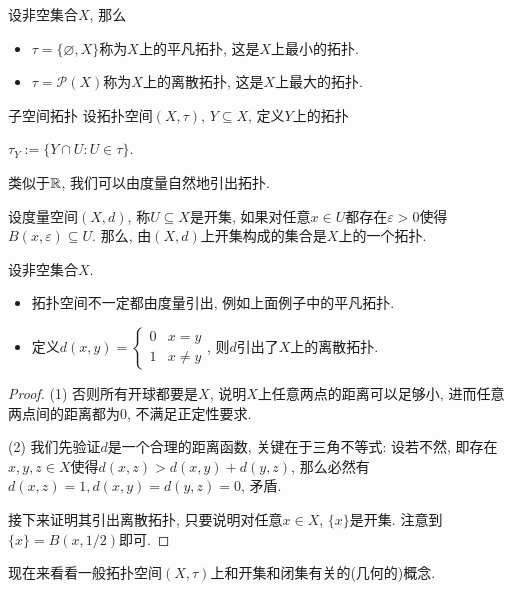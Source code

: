 \begin{example}
	设非空集合$X$, 那么
	\begin{itemize}
		\item $\tau = \{ \varnothing ,X\}$称为$X$上的平凡拓扑, 这是$X$上最小的拓扑. 
		\item $\tau = \mathcal{P}(X)$称为$X$上的离散拓扑, 这是$X$上最大的拓扑. 
	\end{itemize}
\end{example}

\begin{definition}{子空间拓扑}
	设拓扑空间$(X,\tau)$, $Y \subseteq X$, 定义$Y$上的拓扑
	\begin{center}
		$\tau _Y := \{ Y \cap U:U \in \tau \}. $
	\end{center}
\end{definition}

类似于$\mathbb{R}$, 我们可以由度量自然地引出拓扑. 

\begin{proposition}{}
	设度量空间$(X,d)$, 称$U \subseteq X$是开集, 如果对任意$x \in U$都存在$\varepsilon >0$使得$B(x,\varepsilon) \subseteq U$. 那么, 由$(X,d)$上开集构成的集合是$X$上的一个拓扑. 
\end{proposition}

\begin{example}
	设非空集合$X$. 
	\begin{itemize}
		\item 拓扑空间不一定都由度量引出, 例如上面例子中的平凡拓扑. 
		\item 定义$d(x,y)= \begin{cases}
 0 &  x=y \\
 1 &  x\neq y
\end{cases}$, 则$d$引出了$X$上的离散拓扑. 
	\end{itemize}
\end{example}
\begin{proof}
	(1) 否则所有开球都要是$X$, 说明$X$上任意两点的距离可以足够小, 进而任意两点间的距离都为$0$, 不满足正定性要求. 
	
	(2) 我们先验证$d$是一个合理的距离函数, 关键在于三角不等式: 设若不然, 即存在$x,y,z \in X$使得$d(x,z)>d(x,y)+d(y,z)$, 那么必然有$d(x,z)=1,d(x,y)=d(y,z)=0$, 矛盾. 
	
	接下来证明其引出离散拓扑, 只要说明对任意$x \in X$, $\{ x \}$是开集. 注意到$\{ x \}=B(x,1/2)$即可. 
\end{proof}

现在来看看一般拓扑空间$(X,\tau)$上和开集和闭集有关的(几何的)概念. 


